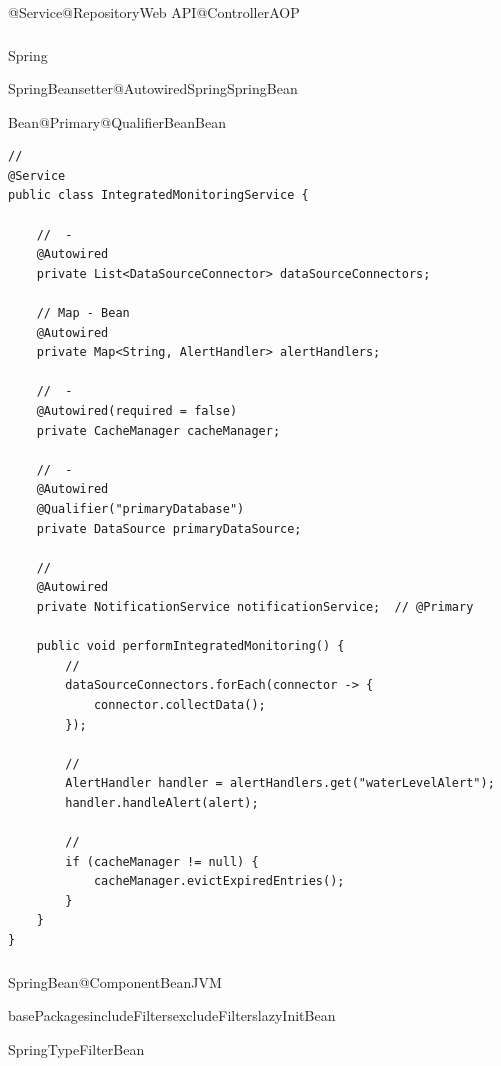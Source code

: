 @Service@RepositoryWeb API@ControllerAOP

\hypertarget{section-54}{%
\subsubsection{}\label{section-54}}

Spring\important{}

\important{}SpringBeansetter@AutowiredSpring\important{}SpringBean

Bean\important{}@Primary@QualifierBeanBean

\begin{lstlisting}[style=java]
// 
@Service
public class IntegratedMonitoringService {
    
    //  - 
    @Autowired
    private List<DataSourceConnector> dataSourceConnectors;
    
    // Map - Bean
    @Autowired
    private Map<String, AlertHandler> alertHandlers;
    
    //  - 
    @Autowired(required = false)
    private CacheManager cacheManager;
    
    //  - 
    @Autowired
    @Qualifier("primaryDatabase")
    private DataSource primaryDataSource;
    
    // 
    @Autowired
    private NotificationService notificationService;  // @Primary
    
    public void performIntegratedMonitoring() {
        // 
        dataSourceConnectors.forEach(connector -> {
            connector.collectData();
        });
        
        // 
        AlertHandler handler = alertHandlers.get("waterLevelAlert");
        handler.handleAlert(alert);
        
        // 
        if (cacheManager != null) {
            cacheManager.evictExpiredEntries();
        }
    }
}
\end{lstlisting}

\hypertarget{section-55}{%
\subsubsection{}\label{section-55}}

SpringBean@ComponentBean\important{}JVM

basePackagesincludeFiltersexcludeFilterslazyInitBean

SpringTypeFilterBean

